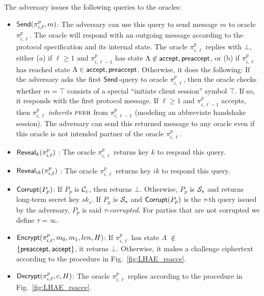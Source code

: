 The adversary issues the following queries to the oracles:
\begin{itemize}
 \item {$\mathsf{Send}(\pi^p_{i, \ell}, m)$:
    The adversary can use this query to send message $m$ to oracle $\pi^p_{i, \ell}$.
    The oracle will respond with an outgoing message according
    to the protocol specification and its internal state.
    The oracle $\pi^p_{i, \ell}$ replies with $\bot$, either
    (a) if $\ell \geq 1$ and $\pi^p_{i, {\ell-1}}$ has state $\Lambda\not\in {\ensuremath{\mathsf{accept}}, \ensuremath{\mathsf{preaccept}}}$,
    or
    (b) if $\pi^p_{i,\ell}$ has reached state $\Lambda\in{\ensuremath{\mathsf{accept}},\ensuremath{\mathsf{preaccept}}}$.
    Otherwise, it does the following:
    If the adversary asks the first $\mathsf{Send}$-query to oracle $\pi^p_{i, \ell}$,
    then the oracle checks whether $m = \top$ consists of a special ``initiate client session'' symbol $\top$.
    If so, it responds with the first protocol message.
    If $\ell \geq 1$ and $\pi^p_{i,\ell-1}$ accepts, then $\pi^p_{i,\ell}$ \textit{inherits} $\textsc{peer}$
    from $\pi^p_{i, \ell-1}$ (modeling an abbreviate handshake session).
    The adversary can send this returned message to any oracle even if this oracle is not intended partner of the oracle $\pi^p_{i, \ell}$.}

 \item {$\mathsf{Reveal}_{k}(\pi^p_{i,\ell})$ :
    The oracle $\pi^p_{i,\ell}$ returns key $k$ to respond this query. }

 \item {$\mathsf{Reveal}_{ik}(\pi^p_{i,\ell})$ :
    The oracle $\pi^p_{i,\ell}$ returns key $ik$ to respond this query. }

 \item {$\mathsf{Corrupt}(P_p)$:
    If $P_p$ is $\mathcal{C}_c$, then returns $\bot$. Otherwise, $P_p$ is $\mathcal{S}_s$ and returns
    long-term secret key $sk_s$.
    If $P_p$ is $\mathcal{S}_s$ and $\mathsf{Corrupt}(P_p)$ is the $\tau$-th query issued by the adversary,
    $P_p$ is said $\tau$-\textit{corrupted}.
    For parties that are not corrupted we define $\tau = \infty$.}

 \item {$\mathsf{Encrypt}(\pi^p_{i,\ell}, m_0, m_1, len, H)$:
    If $\pi^p_{i,\ell}$ has state
    $\Lambda$ $\not\in$ \\ $\{\mathsf{preaccept}, \mathsf{accept}\}$, it returns $\bot$.
    Otherwise, it makes a challenge ciphertext according to the procedure in Fig.~\ref{fig:LHAE_rsacce}.}

 \item {$\mathsf{Decrypt}(\pi^p_{i, \ell}, c, H)$:
    The oracle $\pi^p_{i, \ell}$ replies according to the procedure in Fig.~\ref{fig:LHAE_rsacce}.}
\end{itemize}

